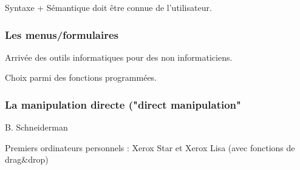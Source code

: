 \documentclass{report}
\begin{document}
Syntaxe + Sémantique doit être connue de l'utilisateur.

\subsubsection{Les menus/formulaires}
Arrivée des outils informatiques pour des non informaticiens.

Choix parmi des fonctions programmées.

\subsubsection{La manipulation directe ("direct manipulation"}
B. Schneiderman

Premiers ordinateurs personnels : Xerox Star et Xerox Lisa (avec fonctions de drag&drop)
\end{document}
